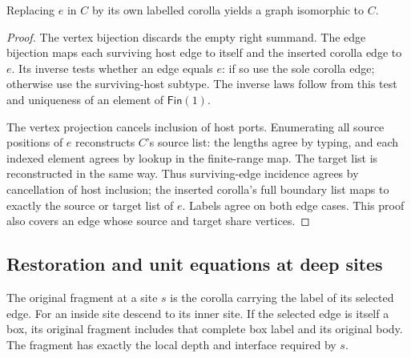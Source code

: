 \begin{lemma}
Replacing $e$ in $C$ by its own labelled corolla yields a graph isomorphic to $C$.
\end{lemma}
\begin{proof}
The vertex bijection discards the empty right summand. The edge bijection maps
each surviving host edge to itself and the inserted corolla edge to $e$.
Its inverse tests whether an edge equals $e$: if so use the sole corolla edge;
otherwise use the surviving-host subtype. The inverse laws follow from this
test and uniqueness of an element of $\mathsf{Fin}(1)$.

The vertex projection cancels inclusion of host ports. Enumerating all source
positions of $e$ reconstructs $C$'s source list: the lengths agree by typing,
and each indexed element agrees by lookup in the finite-range map. The target
list is reconstructed in the same way. Thus surviving-edge incidence agrees
by cancellation of host inclusion; the inserted corolla's full boundary list
maps to exactly the source or target list of $e$. Labels agree on both edge
cases. This proof also covers an edge whose source and target share vertices.
\end{proof}

\subsection{Restoration and unit equations at deep sites}

\begin{definition}\label{term:original-fragment}
The original fragment at a site $s$ is the corolla carrying the label of its
selected edge. For an inside site descend to its inner site. If the selected
edge is itself a box, its original fragment includes that complete box label
and its original body. The fragment has exactly the local depth and interface
required by $s$.
\end{definition}

